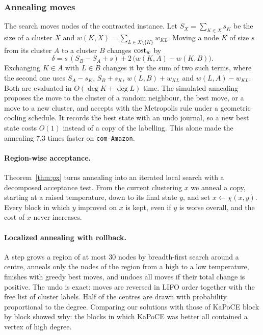 \subsubsection{Annealing moves}

The search moves nodes of the contracted instance.  Let $S_X=\sum_{K\in X}s_K$
be the size of a cluster $X$ and $w(K,X)=\sum_{L\in X\setminus\{K\}}w_{KL}$.
Moving a node $K$ of size $s$ from its cluster $A$ to a cluster $B$ changes
$\mathrm{cost}_w$ by
\begin{equation}\label{eq:move}
\delta=s\,(S_B-S_A+s)+2\,\bigl(w(K,A)-w(K,B)\bigr).
\end{equation}
Exchanging $K\in A$ with $L\in B$ changes it by the sum of two such terms,
where the second one uses $S_A-s_K$, $S_B+s_K$, $w(L,B)+w_{KL}$ and
$w(L,A)-w_{KL}$.  Both are evaluated in $O(\deg K+\deg L)$ time.  The
simulated annealing~\citep{KirkpatrickGV83} proposes the move to the cluster
of a random neighbour, the best move, or a move to a new cluster, and accepts
with the Metropolis rule under a geometric cooling schedule.  It records the
best state with an undo journal, so a new best state costs $O(1)$ instead of
a copy of the labelling.  This alone made the annealing $7.3$ times faster on
\texttt{com-Amazon}.

\paragraph{Region-wise acceptance.}  Theorem~\ref{thm:px} turns annealing into
an iterated local search with a decomposed acceptance test.  From the current
clustering $x$ we anneal a copy, starting at a raised temperature, down to its
final state $y$, and set $x\gets\chi(x,y)$.  Every block in which $y$ improved
on $x$ is kept, even if $y$ is worse overall, and the cost of $x$ never
increases.

\paragraph{Localized annealing with rollback.}  A step grows a region of at
most $30$ nodes by breadth-first search around a centre, anneals only the
nodes of the region from a high to a low temperature, finishes with greedy best
moves, and undoes all moves if their total change is positive.  The undo is
exact: moves are reversed in LIFO order together with the free list of
cluster labels.  Half of the centres are drawn with probability proportional to
the degree.  Comparing our solutions with those of KaPoCE block by block showed
why: the blocks in which KaPoCE was better all contained a vertex of high
degree.

